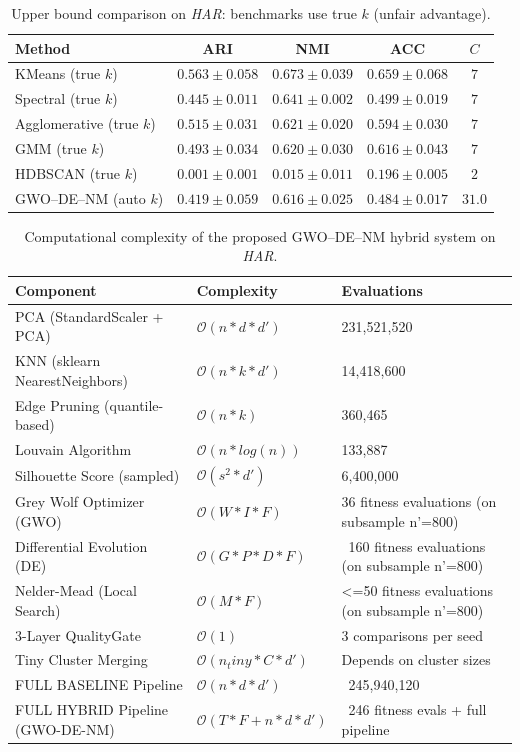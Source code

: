 \begin{table}[htbp]
\centering\small
\caption{Upper bound comparison on \textit{HAR}: benchmarks use true $k$ (unfair advantage).}
\label{tab:upper_har}
\begin{tabular}{lcccc}
\toprule
Method & ARI & NMI & ACC & $C$ \\
\midrule
KMeans (true $k$) & $0.563 \pm 0.058$ & $0.673 \pm 0.039$ & $0.659 \pm 0.068$ & $7$ \\
Spectral (true $k$) & $0.445 \pm 0.011$ & $0.641 \pm 0.002$ & $0.499 \pm 0.019$ & $7$ \\
Agglomerative (true $k$) & $0.515 \pm 0.031$ & $0.621 \pm 0.020$ & $0.594 \pm 0.030$ & $7$ \\
GMM (true $k$) & $0.493 \pm 0.034$ & $0.620 \pm 0.030$ & $0.616 \pm 0.043$ & $7$ \\
HDBSCAN (true $k$) & $0.001 \pm 0.001$ & $0.015 \pm 0.011$ & $0.196 \pm 0.005$ & $2$ \\
\midrule
GWO--DE--NM (auto $k$) & $\mathbf{0.419 \pm 0.059}$ & $\mathbf{0.616 \pm 0.025}$ & $\mathbf{0.484 \pm 0.017}$ & $31.0$ \\
\bottomrule
\end{tabular}
\end{table}

\begin{table}[htbp]
\centering
\small
\caption{Computational complexity of the proposed GWO--DE--NM hybrid system on \textit{HAR}.}
\label{tab:complexity_har}
\begin{tabular}{lll}
\toprule
Component & Complexity & Evaluations \\
\midrule
PCA (StandardScaler + PCA) & $\mathcal{O}(n * d * d')$ & 231,521,520 \\
KNN (sklearn NearestNeighbors) & $\mathcal{O}(n * k * d')$ & 14,418,600 \\
Edge Pruning (quantile-based) & $\mathcal{O}(n * k)$ & 360,465 \\
Louvain Algorithm & $\mathcal{O}(n * log(n))$ & 133,887 \\
Silhouette Score (sampled) & $\mathcal{O}(s^2 * d')$ & 6,400,000 \\
Grey Wolf Optimizer (GWO) & $\mathcal{O}(W * I * F)$ & 36 fitness evaluations (on subsample n'=800) \\
Differential Evolution (DE) & $\mathcal{O}(G * P * D * F)$ & ~160 fitness evaluations (on subsample n'=800) \\
Nelder-Mead (Local Search) & $\mathcal{O}(M * F)$ & <=50 fitness evaluations (on subsample n'=800) \\
3-Layer QualityGate & $\mathcal{O}(1)$ & 3 comparisons per seed \\
Tiny Cluster Merging & $\mathcal{O}(n_tiny * C * d')$ & Depends on cluster sizes \\
\midrule
FULL BASELINE Pipeline & $\mathcal{O}(n * d * d')$ & ~245,940,120 \\
\midrule
FULL HYBRID Pipeline (GWO-DE-NM) & $\mathcal{O}(T * F + n * d * d')$ & ~246 fitness evals + full pipeline \\
\bottomrule
\end{tabular}
\end{table}